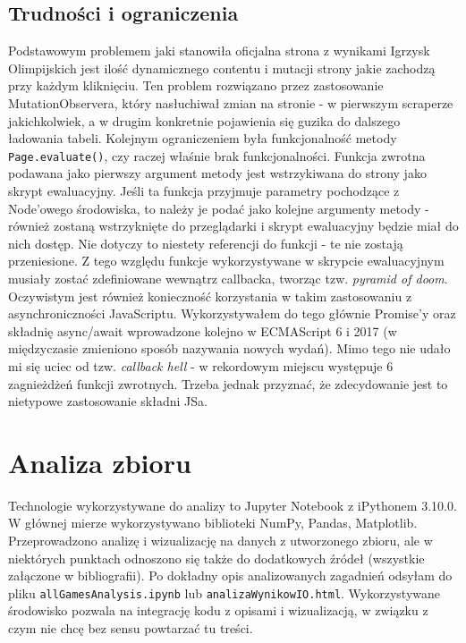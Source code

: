 \documentclass[a4paper,11pt]{article}
\begin{document}
\subsection{Trudności i ograniczenia}
    Podstawowym problemem jaki stanowiła oficjalna strona z wynikami Igrzysk
    Olimpijskich jest ilość dynamicznego contentu i mutacji strony jakie zachodzą
    przy każdym kliknięciu. Ten problem rozwiązano przez zastosowanie
    MutationObservera, który nasłuchiwał zmian na stronie - w pierwszym scraperze
    jakichkolwiek, a w drugim konkretnie pojawienia się guzika do dalszego
    ładowania tabeli.
    \newline
    Kolejnym ograniczeniem była funkcjonalność metody \verb|Page.evaluate()|,
    czy raczej właśnie brak funkcjonalności. Funkcja zwrotna podawana jako 
    pierwszy argument metody jest wstrzykiwana do strony jako skrypt ewaluacyjny.
    Jeśli ta funkcja przyjmuje parametry pochodzące z Node'owego środowiska, to 
    należy je podać jako kolejne argumenty metody - również zostaną wstrzyknięte
    do przeglądarki i skrypt ewaluacyjny będzie miał do nich dostęp. Nie dotyczy
    to niestety referencji do funkcji - te nie zostają przeniesione. Z tego 
    względu funkcje wykorzystywane w skrypcie ewaluacyjnym musiały zostać 
    zdefiniowane wewnątrz callbacka, tworząc tzw. \textit{pyramid of doom}.
    \newline
    Oczywistym jest również konieczność korzystania w takim zastosowaniu z
    asynchroniczności JavaScriptu. Wykorzystywałem do tego głównie Promise'y oraz 
    składnię async/await wprowadzone kolejno w ECMAScript 6 i 2017 (w międzyczasie
    zmieniono sposób nazywania nowych wydań). Mimo tego nie udało mi się uciec
    od tzw. \textit{callback hell} - w rekordowym miejscu występuje 6 zagnieżdżeń
    funkcji zwrotnych. Trzeba jednak przyznać, że zdecydowanie jest to nietypowe
    zastosowanie składni JSa.
    
\section{Analiza zbioru}
    Technologie wykorzystywane do analizy to Jupyter Notebook z iPythonem 3.10.0.
    W głównej mierze wykorzystywano biblioteki NumPy, Pandas, Matplotlib.
    Przeprowadzono analizę i wizualizację na danych z utworzonego zbioru, ale 
    w niektórych punktach odnoszono się także do dodatkowych źródeł (wszystkie
    załączone w bibliografii). Po dokładny opis analizowanych zagadnień odsyłam 
    do pliku \verb|allGamesAnalysis.ipynb| lub \verb|analizaWynikowIO.html|.
    Wykorzystywane środowisko pozwala na integrację kodu z opisami i wizualizacją,
    w związku z czym nie chcę bez sensu powtarzać tu treści.
\end{document}
